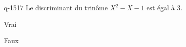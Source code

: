 \begin{truefalse}{q-1517}
Le discriminant du trinôme $X^2-X-1$ est égal à $3$.
\item Vrai
\item* Faux
\end{truefalse}


